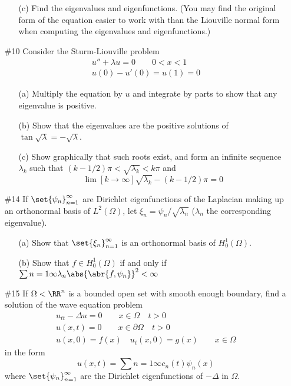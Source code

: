 \documentclass[11pt, oneside]{article}
\begin{document}
\begin{enumerate}
\begin{enumerate}
      \item[(c)]
        Find the eigenvalues and eigenfunctions.
        (You may find the original form of the equation easier to work with than
        the Liouville normal form when computing the eigenvalues and
        eigenfunctions.)

        
    \end{enumerate}

  \pagebreak
  \item[\#10]
    Consider the Sturm-Liouville problem
    \begin{align*}
      u'' + \lambda u = 0 \qquad 0 < x < 1 \\
      u(0) - u'(0) = u(1) = 0
    \end{align*}
    \begin{enumerate}
      \item[(a)]
        Multiply the equation by $u$ and integrate by parts to show that any
        eigenvalue is positive.

      \item[(b)]
        Show that the eigenvalues are the positive solutions of
        $\tan{\sqrt{\lambda}} = - \sqrt{\lambda}$.

      \item[(c)]
        Show graphically that such roots exist, and form an infinite sequence
        $\lambda_k$ such that $(k - 1/2)\pi < \sqrt{\lambda_k} < k \pi$ and
        \[
          \lim[k \to \infty]{\sqrt{\lambda_k} - (k - 1/2)\pi} = 0
        \]
    \end{enumerate}

  \pagebreak
  \item[\#14]
    If $\set{\psi_n}_{n = 1}^{\infty}$ are Dirichlet eigenfunctions of the
    Laplacian making up an orthonormal basis of $L^2(\Omega)$, let
    $\xi_n = \psi_n/\sqrt{\lambda_n}$
    ($\lambda_n$ the corresponding eigenvalue).
    \begin{enumerate}
      \item[(a)]
        Show that $\set{\xi_n}_{n = 1}^{\infty}$ is an orthonormal basis of
        $H^1_0(\Omega)$.

      \item[(b)]
        Show that $f \in H_0^1(\Omega)$ if and only if
        $\sum{n = 1}{\infty}{\lambda_n \abs{\abr{f, \psi_n}}^2} < \infty$
    \end{enumerate}

  \pagebreak
  \item[\#15]
    If $\Omega < \RR^n$ is a bounded open set with smooth enough boundary, find
    a solution of the wave equation problem
    \begin{align*}
      u_{tt} - \Delta u = 0 \qquad x \in \Omega \quad t > 0 \\
      u(x, t) = 0 \qquad x \in \partial\Omega \quad t > 0 \\
      u(x, 0) = f(x) \quad u_t(x, 0) = g(x) \qquad x \in \Omega
    \end{align*}
    in the form
    \[
      u(x, t) = \sum{n = 1}{\infty}{c_n(t) \psi_n(x)}
    \]
    where $\set{\psi_n}_{n = 1}^{\infty}$ are the Dirichlet eigenfunctions of
    $-\Delta$ in $\Omega$.


\end{enumerate}
\end{document}
